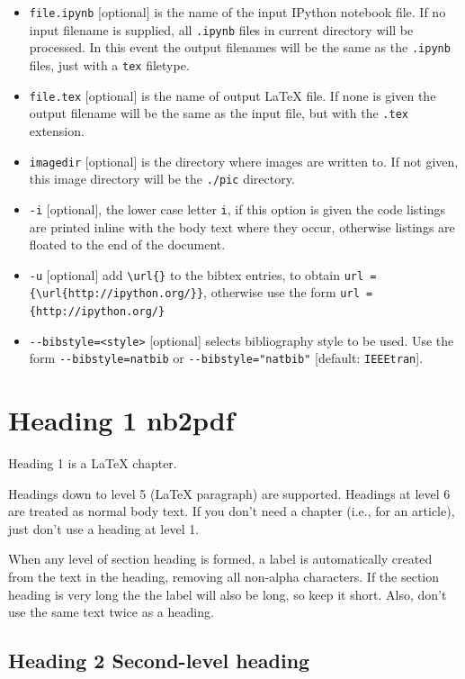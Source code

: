 \documentclass[english]{workpackage}[1996/06/02]
\begin{document}
\begin{itemize}
\item \verb+file.ipynb+  [optional]   is the name of the input IPython notebook file.   If no input filename is  supplied, all  \verb+.ipynb+ files in current directory will be processed.   In this event the output filenames will be the same as the \verb+.ipynb+ files, just with a \verb+tex+ filetype.
\item \verb+file.tex+ [optional]  is the name of output \LaTeX{} file. If none is given the output filename will be the same as the input file, but with the \verb+.tex+ extension.
\item \verb+imagedir+   [optional]   is the directory where images are written to.  If not given, this image directory will be the \verb+./pic+ directory.
\item \verb+-i+  [optional], the lower case letter \verb+i+, if this option is given the code     listings are printed inline with the body text where they occur,       otherwise listings are floated to the end of the document.
\item \verb+-u+ [optional] add \verb+\url{}+ to the bibtex entries, to obtain  \verb+url = {\url{http://ipython.org/}}+, otherwise use the form \verb+url = {http://ipython.org/}+
\item \verb+--bibstyle=<style>+  [optional] selects bibliography style to be used.
     Use the form \verb+--bibstyle=natbib+ or \verb+--bibstyle="natbib"+ [default: \verb+IEEEtran+].
\end{itemize}


\chapter{Heading 1 nb2pdf}
\label{sec:Heading1nb2pdf}

Heading 1 is a \LaTeX{} chapter.


Headings down to level 5 (\LaTeX{} paragraph) are supported. 
Headings at level 6 are treated as normal body text.
If you don't need a chapter (i.e., for an article), just don't use a heading at level 1.


When any level of section heading is formed, a label is automatically created from the text in the heading, removing all non-alpha characters.  If the section heading is very long the the label will also be long, so keep it short. Also, don't use the same text twice as a heading.



\section{Heading 2 Second-level heading}
\label{sec:Heading2Secondlevelheading}
\end{document}
